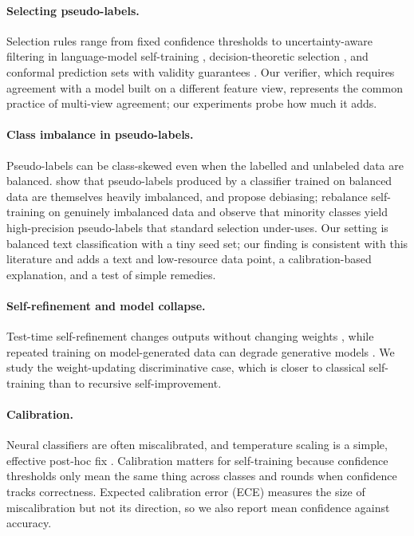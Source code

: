\documentclass[11pt]{article}
\begin{document}
\paragraph{Selecting pseudo-labels.} Selection rules range from fixed confidence thresholds to uncertainty-aware filtering in language-model self-training \citep{wang2023upet}, decision-theoretic selection \citep{rodemann2023decision,rodemann2023likelihoods}, and conformal prediction sets with validity guarantees \citep{lienen2023conformal}. Our verifier, which requires agreement with a model built on a different feature view, represents the common practice of multi-view agreement; our experiments probe how much it adds.

\paragraph{Class imbalance in pseudo-labels.} Pseudo-labels can be class-skewed even when the labelled and unlabeled data are balanced. \citet{wang2022debiased} show that pseudo-labels produced by a classifier trained on balanced data are themselves heavily imbalanced, and propose debiasing; \citet{wei2021crest} rebalance self-training on genuinely imbalanced data and observe that minority classes yield high-precision pseudo-labels that standard selection under-uses. Our setting is balanced text classification with a tiny seed set; our finding is consistent with this literature and adds a text and low-resource data point, a calibration-based explanation, and a test of simple remedies.

\paragraph{Self-refinement and model collapse.} Test-time self-refinement changes outputs without changing weights \citep{madaan2023selfrefine}, while repeated training on model-generated data can degrade generative models \citep{shumailov2024collapse}. We study the weight-updating discriminative case, which is closer to classical self-training than to recursive self-improvement.

\paragraph{Calibration.} Neural classifiers are often miscalibrated, and temperature scaling is a simple, effective post-hoc fix \citep{guo2017calibration}. Calibration matters for self-training because confidence thresholds only mean the same thing across classes and rounds when confidence tracks correctness. Expected calibration error (ECE) measures the size of miscalibration but not its direction, so we also report mean confidence against accuracy.
\end{document}
